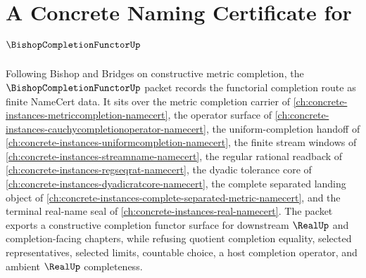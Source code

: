 \chapter{A Concrete Naming Certificate for $\BishopCompletionFunctorUp$}
\label{ch:concrete-instances-bishop-completion-functor-namecert}

Following Bishop and Bridges on constructive metric completion, the $\BishopCompletionFunctorUp$ packet records the functorial completion route as finite NameCert data. It sits over the metric completion carrier of \autoref{ch:concrete-instances-metriccompletion-namecert}, the operator surface of \autoref{ch:concrete-instances-cauchycompletionoperator-namecert}, the uniform-completion handoff of \autoref{ch:concrete-instances-uniformcompletion-namecert}, the finite stream windows of \autoref{ch:concrete-instances-streamname-namecert}, the regular rational readback of \autoref{ch:concrete-instances-regseqrat-namecert}, the dyadic tolerance core of \autoref{ch:concrete-instances-dyadicratcore-namecert}, the complete separated landing object of \autoref{ch:concrete-instances-complete-separated-metric-namecert}, and the terminal real-name seal of \autoref{ch:concrete-instances-real-namecert}. The packet exports a constructive completion functor surface for downstream $\RealUp$ and completion-facing chapters, while refusing quotient completion equality, selected representatives, selected limits, countable choice, a host completion operator, and ambient $\RealUp$ completeness.

